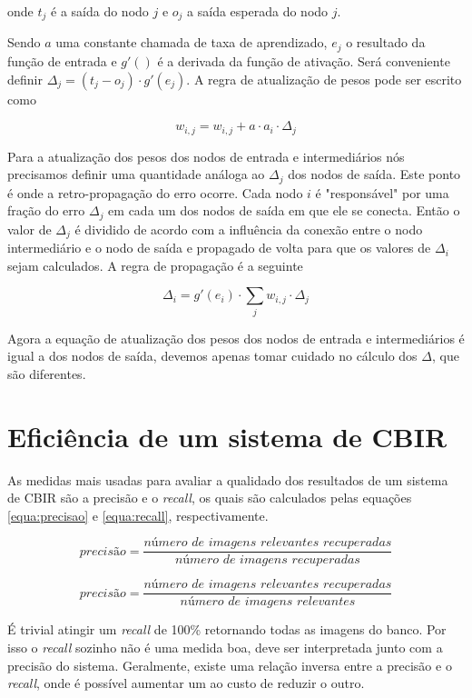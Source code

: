 onde $t_j$ é a saída do nodo $j$ e $o_j$ a saída esperada do nodo $j$.

Sendo $a$ uma constante chamada de taxa de aprendizado, $e_j$ o resultado da função de entrada e $g'()$ é a derivada da função de ativação. Será conveniente definir $\Delta_j = (t_j - o_j) \cdot g'(e_j)$. A regra de atualização de pesos pode ser escrito como

\begin{equation}
	w_{i,j} = w_{i,j} + a \cdot a_i \cdot \Delta_j
\end{equation}

Para a atualização dos pesos dos nodos de entrada e intermediários nós precisamos definir uma quantidade análoga ao $\Delta_j$ dos nodos de saída. Este ponto é onde a retro-propagação do erro ocorre. Cada nodo $i$ é "responsável" por uma fração do erro $\Delta_j$ em cada um dos nodos de saída em que ele se conecta. Então o valor de $\Delta_j$ é dividido de acordo com a influência da conexão entre o nodo intermediário e o nodo de saída e propagado de volta para que os valores de $\Delta_i$ sejam calculados. A regra de propagação é a seguinte

\begin{equation}
	\Delta_i = g'(e_i) \cdot \sum_j w_{i,j} \cdot \Delta_j
\end{equation}

Agora a equação de atualização dos pesos dos nodos de entrada e intermediários é igual a dos nodos de saída, devemos apenas tomar cuidado no cálculo dos $\Delta$, que são diferentes.

\section{Eficiência de um sistema de CBIR}

As medidas mais usadas para avaliar a qualidado dos resultados de um sistema de CBIR são a precisão e o \textit{recall}, os quais são calculados pelas equações \ref{equa:precisao} e \ref{equa:recall}, respectivamente.

\begin{equation}
	\textit{precisão} = \frac{\textit{número de imagens relevantes recuperadas}}{\textit{número de imagens recuperadas}}
	\label{equa:precisao}
\end{equation}

\begin{equation}
	\textit{precisão} = \frac{\textit{número de imagens relevantes recuperadas}}{\textit{número de imagens relevantes}}
	\label{equa:recall}
\end{equation}

É trivial atingir um \textit{recall} de 100\% retornando todas as imagens do banco. Por isso o \textit{recall} sozinho não é uma medida boa, deve ser interpretada junto com a precisão do sistema. Geralmente, existe uma relação inversa entre a precisão e o \textit{recall}, onde é possível aumentar um ao custo de reduzir o outro.
